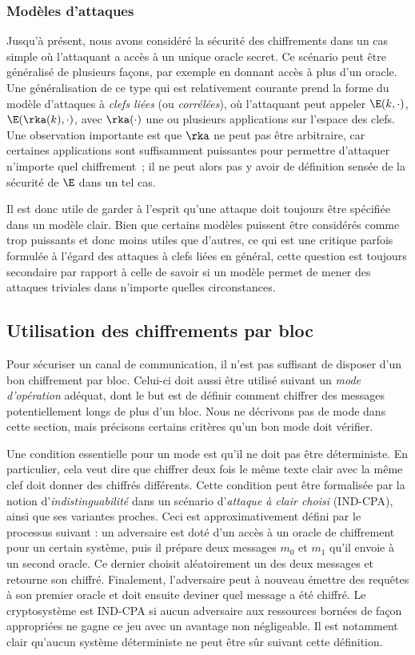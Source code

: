 \subsubsection{Modèles d'attaques}

Jusqu'à présent, nous avons considéré la sécurité des chiffrements dans un cas simple où l'attaquant a accès à un unique oracle secret.
Ce scénario peut être généralisé de plusieurs façons, par exemple en donnant accès à plus d'un oracle. Une généralisation de ce type qui est
relativement courante prend la forme du modèle d'attaques à \emph{clefs liées} (ou \emph{corrélées}), où l'attaquant peut appeler
$\E(k,\cdot)$, $\E(\rka(k),\cdot)$, avec $\rka(\cdot)$ une ou plusieurs applications sur l'espace des clefs.
Une observation importante est que $\rka$ ne peut pas être arbitraire, car certaines applications sont suffisamment puissantes
pour permettre d'attaquer n'importe quel chiffrement~; il ne peut alors pas y avoir de définition sensée de la sécurité de $\E$ dans un tel cas.

Il est donc utile de garder à l'esprit qu'une attaque doit toujours être spécifiée dans un modèle clair. Bien que certains modèles puissent
être considérés comme trop puissants et donc moins utiles que d'autres, ce qui est une critique parfois formulée à l'égard des attaques à clefs liées
en général, cette
question est toujours secondaire par rapport à celle de savoir si un modèle permet de mener des attaques triviales dans n'importe quelles circonstances.

\subsection{Utilisation des chiffrements par bloc}
\label{sec:cf_modes}

Pour sécuriser un canal de communication, il n'est pas suffisant de disposer d'un bon chiffrement par bloc.
Celui-ci doit aussi être utilisé suivant un \emph{mode d'opération} adéquat,
dont le but est de définir comment chiffrer des messages potentiellement longs de plus d'un bloc.
Nous ne décrivons pas de mode dans cette section, mais précisons certains critères qu'un bon mode doit vérifier.

Une condition essentielle pour un mode est qu'il ne doit pas être déterministe. En particulier,
cela veut dire que chiffrer deux fois le même texte clair avec la même clef doit donner des chiffrés différents.
Cette condition peut être formalisée par la notion d'\emph{indistinguabilité} dans un scénario d'\emph{attaque à clair choisi}
(\textsf{IND-CPA}), ainsi que ses variantes proches. Ceci est approximativement défini par le processus suivant : un adversaire est doté d'un accès
à un oracle de chiffrement pour un certain système, puis il prépare deux messages $m_0$ et $m_1$ qu'il envoie à un second oracle. Ce dernier
choisit aléatoirement un des deux messages et retourne son chiffré. Finalement, l'adversaire peut à nouveau émettre des requêtes à son premier oracle et doit ensuite
deviner quel message a été chiffré. Le cryptosystème est \textsf{IND-CPA} si aucun adversaire aux ressources bornées de façon appropriées ne gagne ce jeu
avec un avantage non négligeable. Il est notamment clair qu'aucun système déterministe ne peut être sûr suivant cette définition.


